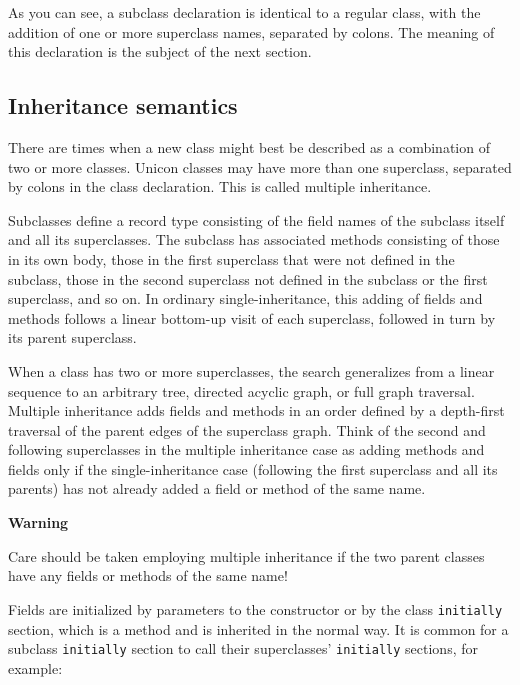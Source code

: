 As you can see, a subclass declaration is identical to a regular class,
with the addition of one or more superclass names, separated by colons.
The meaning of this declaration is the subject of the next section. 

\subsection*{Inheritance semantics}

There are times when a new class might best
be described as a combination of two or more classes. Unicon classes
may have more than one superclass, separated by colons in the class
declaration. This is called multiple inheritance.

Subclasses define a record type consisting of the field names of the
subclass itself and all its superclasses. The subclass has associated
methods consisting of those in its own body, those in the first
superclass that were not defined in the subclass, those in the second
superclass not defined in the subclass or the first superclass, and so
on. In ordinary single-inheritance, this adding of fields and methods
follows a linear bottom-up visit of each superclass,
followed in turn by its parent superclass. 

When a class has two or more superclasses, the search generalizes from a
linear sequence to an arbitrary tree, directed acyclic
graph, or full graph traversal. 
Multiple inheritance adds fields and
methods in an order defined by a depth-first traversal of the parent
edges of the superclass graph. Think of the second and following
superclasses in the
multiple inheritance case as adding methods and fields only if the
single-inheritance case (following the first superclass and all its
parents) has not already added a field or method of the same name. 

{\sffamily\bfseries
Warning}

{\sffamily
Care should be taken employing multiple inheritance if the two parent
classes have any fields or methods of the same name! }

Fields are initialized by parameters to the constructor or by the
class \texttt{initially} section, which is a method and is
inherited in the normal way. It is common for a subclass \texttt{initially}
section to call their superclasses'
\texttt{initially} sections, for example:


